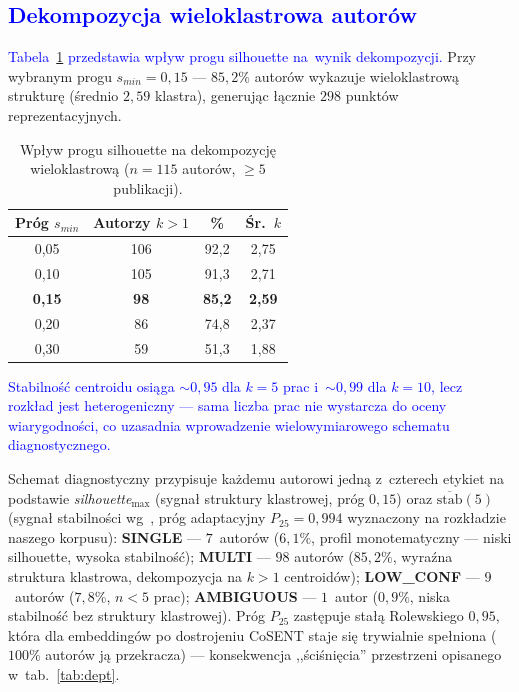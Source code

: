 \documentclass[a4paper,11pt,twocolumn]{article}
\newcommand{\hl}[1]{\textcolor{blue}{#1}}
\begin{document}
\subsection{\hl{Dekompozycja wieloklastrowa autorów}}

\hl{Tabela~\ref{tab:threshold} przedstawia wpływ progu silhouette
na~wynik dekompozycji.} Przy wybranym progu $s_{min}=0{,}15$ ---
$85{,}2\%$ autorów wykazuje wieloklastrową strukturę (średnio $2{,}59$
klastra), generując łącznie $298$ punktów reprezentacyjnych.

\begin{table}[t]
\centering
\caption{Wpływ progu silhouette na dekompozycję wieloklastrową
($n=115$ autorów, $\geq 5$ publikacji).}
\label{tab:threshold}
\small
\begin{tabular}{@{}cccc@{}}
\toprule
Próg $s_{min}$ & Autorzy $k\!>\!1$ & \% & Śr.\ $k$ \\
\midrule
0,05 & 106 & 92,2 & 2,75 \\
0,10 & 105 & 91,3 & 2,71 \\
\textbf{0,15} & \textbf{98} & \textbf{85,2} & \textbf{2,59} \\
0,20 & 86  & 74,8 & 2,37 \\
0,30 & 59  & 51,3 & 1,88 \\
\bottomrule
\end{tabular}
\end{table}

\hl{Stabilność centroidu osiąga $\sim\!0{,}95$ dla $k=5$ prac
i~$\sim\!0{,}99$ dla $k=10$, lecz rozkład jest heterogeniczny ---
sama liczba prac nie wystarcza do oceny wiarygodności, co uzasadnia
wprowadzenie wielowymiarowego schematu diagnostycznego.}

Schemat diagnostyczny przypisuje każdemu autorowi jedną z~czterech
etykiet na podstawie \emph{silhouette}$_{\max}$ (sygnał struktury
klastrowej, próg $0{,}15$) oraz $\overline{\text{stab}}(5)$ (sygnał
stabilności wg~\cite{rolewski2024}, próg adaptacyjny $P_{25}=0{,}994$
wyznaczony na rozkładzie naszego korpusu): \textbf{SINGLE} ---
$7$~autorów ($6{,}1\%$, profil monotematyczny --- niski silhouette,
wysoka stabilność); \textbf{MULTI} --- $98$ autorów ($85{,}2\%$, wyraźna
struktura klastrowa, dekompozycja na $k\!>\!1$ centroidów);
\textbf{LOW\_CONF} --- $9$~autorów ($7{,}8\%$, $n\!<\!5$ prac);
\textbf{AMBIGUOUS} --- $1$~autor ($0{,}9\%$, niska stabilność bez
struktury klastrowej). Próg $P_{25}$ zastępuje stałą Rolewskiego
$0{,}95$, która dla embeddingów po dostrojeniu CoSENT staje się
trywialnie spełniona ($100\%$ autorów ją przekracza) --- konsekwencja
,,ściśnięcia'' przestrzeni opisanego w~tab.~\ref{tab:dept}.
\end{document}
